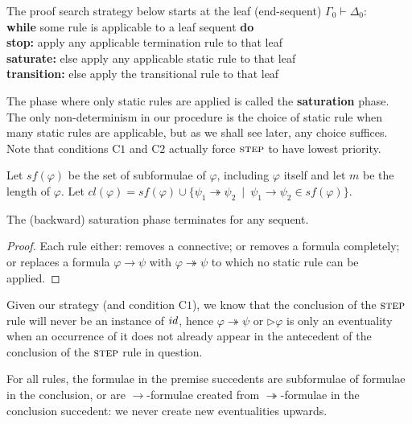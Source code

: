 \documentclass[envcountsect,envcountsame]{llncs}
\newcommand{\condone}{\mathrm{C1}}
\newcommand{\condtwo}{\mathrm{C2}}
\newcommand{\iimp}{\twoheadrightarrow}
\newcommand{\limp}{\rightarrow}
\newcommand{\nxt}{\rhd}
\newcommand{\seq}{\vdash}
\newcommand{\idrulename}{\small id}
\newcommand{\steprulename}{\textsc{step}}
\newcommand{\newsteprulename}{\textsc{step}}
\begin{document}
The proof search strategy below starts at the leaf (end-sequent)
  $\Gamma_0 \seq \Delta_0$: \vspace{2mm} 
\\
\textbf{while} some rule is applicable to a leaf sequent \textbf{do} \\
  \hphantom{11}\textbf{stop:} apply any applicable termination rule to that leaf \\
  \hphantom{11}\textbf{saturate:}  else apply any applicable static rule to that leaf \\
\hphantom{11}\textbf{transition:} else apply the transitional rule to that leaf \vspace{2mm}

The phase where only static
rules are applied is called the \textbf{saturation} phase. The
only non-determinism in our procedure is the choice of static rule
when many static rules are applicable, but as we shall see later, any
choice suffices. Note that conditions $\condone$ and $\condtwo$ actually
force $\newsteprulename$ to have lowest priority.

 Let 
 $sf(\varphi)$ 
 be the set of subformulae of $\varphi$, including 
 $\varphi$ itself and let $m$ be the length of $\varphi$.
 Let 
 $cl(\varphi) = sf(\varphi) 
     \cup 
   \{\psi_1\iimp\psi_2~\mid~
     \psi_1\limp\psi_2 \in sf(\varphi)\}$.

\begin{proposition}\label{prop:saturation-terminates}
  The (backward) saturation phase terminates for any sequent.
\end{proposition}
\begin{proof}
Each rule either: removes a connective; or removes a formula completely; or replaces a
formula $\varphi\limp\psi$ with $\varphi\iimp\psi$ to which no static rule can be
applied.
\end{proof}

Given our strategy (and condition $\condone$), 
we know  that the conclusion of the
$\steprulename$
rule will never  be an instance of 
$\idrulename$, 
hence 
$\varphi\iimp\psi$  or
$\nxt\varphi$
is only an eventuality when an occurrence of it does not already
appear in the antecedent of the conclusion of the 
$\steprulename$ rule
in question. 

\begin{proposition}\label{prop:nonew}
For all rules, the formulae in the premise succedents
are subformulae of formulae in the
conclusion, or are $\limp$-formulae created from $\iimp$-formulae
in the conclusion succedent: we never create new eventualities upwards.
\end{proposition}
\end{document}
